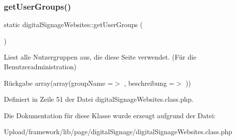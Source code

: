 \mbox{\label{classdigital_signage_websites_a6a5fc836a518d67a481a3d64b4ab2005}} 
\subsubsection{\texorpdfstring{get\+User\+Groups()}{getUserGroups()}}
{\footnotesize\ttfamily static digital\+Signage\+Websites\+::get\+User\+Groups (\begin{DoxyParamCaption}{ }\end{DoxyParamCaption})\hspace{0.3cm}{\ttfamily [static]}}

Liest alle Nutzergruppen aus, die diese Seite verwendet. (Für die Benutzeradministration) \begin{DoxyReturn}{Rückgabe}
array(array(\textquotesingle{}group\+Name\textquotesingle{} =$>$ \textquotesingle{}\textquotesingle{}, \textquotesingle{}beschreibung\textquotesingle{} =$>$ \textquotesingle{}\textquotesingle{})) 
\end{DoxyReturn}


Definiert in Zeile 51 der Datei digital\+Signage\+Websites.\+class.\+php.



Die Dokumentation für diese Klasse wurde erzeugt aufgrund der Datei\+:\begin{DoxyCompactItemize}
\item 
Upload/framework/lib/page/digital\+Signage/digital\+Signage\+Websites.\+class.\+php\end{DoxyCompactItemize}
